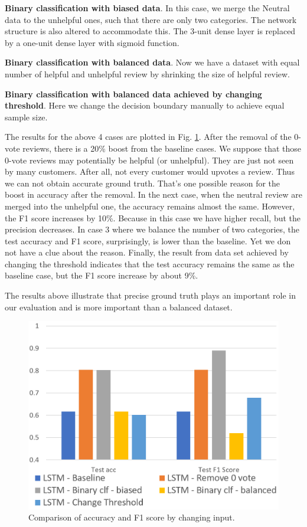 \documentclass[11pt]{article}
\begin{document}
\textbf{Binary classification with biased data}. In this case, we merge the Neutral data to the unhelpful ones, such that there are only two categories. The network structure is also altered to accommodate this. The 3-unit dense layer is replaced by a one-unit dense layer with sigmoid function. 

\textbf{Binary classification with balanced data}. Now we have a dataset with equal number of helpful and unhelpful review by shrinking the size of helpful review.

\textbf{Binary classification with balanced data achieved by changing threshold}. Here we change the decision boundary manually to achieve equal sample size. 

The results for the above 4 cases are plotted in Fig. \ref{result_f1_comp_ip}. After the removal of the 0-vote reviews, there is a 20\% boost from the baseline cases. We suppose that those 0-vote reviews may potentially be helpful (or unhelpful). They are just not seen by many customers. After all, not every customer would upvotes a review. Thus we can not obtain accurate ground truth. That's one possible reason for the boost in accuracy after the removal. In the next case, when the neutral review are merged into the unhelpful one, the accuracy remains almost the same. However, the F1 score increases by 10\%. Because in this case we have higher recall, but the precision decreases. In case 3 where we balance the number of two categories, the test accuracy and F1 score, surprisingly, is lower than the baseline. Yet we don not have a clue about the reason. Finally, the result from data set achieved by changing the threshold indicates that the test accuracy remains the same as the baseline case, but the F1 score increase by about 9\%. 

The results above illustrate that precise ground truth plays an important role in our evaluation and is more important than a balanced dataset. 

\begin{figure}[tbp]
    \centering
    \includegraphics[width=0.9\linewidth]{figures/acc_f1_comp_ip.png}
    \caption{Comparison of accuracy and F1 score by changing input.}
    \label{result_f1_comp_ip}
\end{figure}
\end{document}
